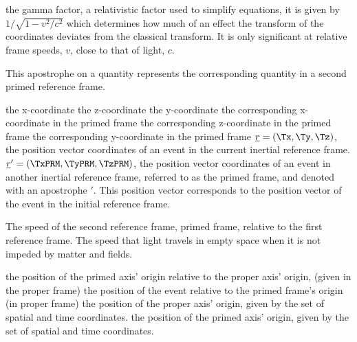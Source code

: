 


\variableterm{\Tg}{\gamma}
{the gamma factor, a relativistic factor used to simplify equations, it is given by ${1/\sqrt{1-v^2/c^2}}$ which determines how much of an effect the transform of the coordinates deviates from the classical transform. It is only significant at relative frame speeds, $v$, close to that of light, $c$.}



{This apostrophe on a quantity represents the corresponding quantity in a second primed reference frame.}

{the x-coordinate}
{the z-coordinate}
{the y-coordinate}
\variableterm{\TxPRM}{\Tx\Tprime}
{the corresponding x-coordinate in the primed frame}
\variableterm{\TzPRM}{\Tz\Tprime}
{the corresponding z-coordinate in the primed frame}
\variableterm{\TyPRM}{\Ty\Tprime}
{the corresponding y-coordinate in the primed frame}
{$\underline{r}=(\Tx,\Ty,\Tz)$, the position vector coordinates of an event in the current inertial reference frame.}
\variableterm{\TVecrPRM}{\TVecr\Tprime}
{$\underline{r}'=(\TxPRM,\TyPRM,\TzPRM)$, the position vector coordinates of an event in another inertial reference frame, referred to as the primed frame, and denoted with an apostrophe $'$. This position vector corresponds to the position vector of the event in the initial reference frame.}


{The speed of the second reference frame, primed frame, relative to the first reference frame.}
{The speed that light travels in empty space when it is not impeded by matter and fields.}

{the position of the primed axis' origin relative to the proper axis' origin, (given in the proper frame)}
{the position of the event relative to the primed frame's origin (in proper frame)}
{the position of the proper axis' origin, given by the set of spatial and time coordinates.}
{the position of the primed axis' origin, given by the set of spatial and time coordinates.}

